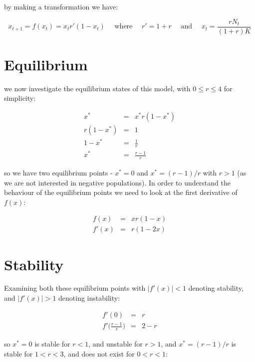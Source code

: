 \documentclass{report}
\begin{document}
by making a transformation we have: \bigskip

\[
    x_{t + 1} = f(x_t) = x_t r' (1 - x_t) \quad \text{ where } \quad r' = 1 + r  \quad \text{ and }  \quad x_t = \frac{r N_t}{(1 + r) K}
\]\medskip




\section{Equilibrium}

we now investigate the equilibrium states of this model, with $0 \le r \le 4$ for
simplicity: \bigskip

\begin{eqnarray*}
         x^* & = & x^* r (1 - x^*) \\
 r (1 - x^*) & = & 1 \\
     1 - x^* & = & \frac{1}{r} \\
         x^* & = & \frac{r - 1}{r}
\end{eqnarray*}\medskip

so we have two equilibrium points - $x^* = 0$ and $x^* = (r - 1)/r$ with $r > 1$ (as we
are not interested in negative populations). In order to understand the behaviour of the
equilibrium points we need to look at the first derivative of $f(x)$: \bigskip

\begin{eqnarray*}
   f(x) & = & x r (1 - x) \\
  f'(x) & = & r (1 - 2x)
\end{eqnarray*}\medskip




\section{Stability}

Examining both these equilibrium points with $\left| f'(x) \right| < 1$ denoting stability,
and $\left| f'(x) \right| > 1$ denoting instability: \bigskip

\begin{eqnarray*}
                            f'(0) & = & r \\
    f'\bigg(\frac{r - 1}{r}\bigg) & = & 2 - r
\end{eqnarray*}\medskip

so $x^* = 0$ is stable for $r < 1$, and unstable for $r > 1$, and $x^* = (r - 1) / r$ is stable for $1 < r < 3$,
and does not exist for $0 < r < 1$: \bigskip
\end{document}
